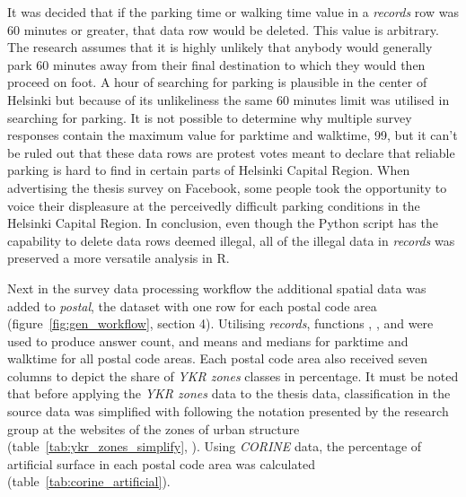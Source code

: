 It was decided that if the parking time or walking time value in a \textit{records} row was 60 minutes or greater, that data row would be deleted. This value is arbitrary. The research assumes that it is highly unlikely that anybody would generally park 60 minutes away from their final destination to which they would then proceed on foot. A hour of searching for parking is plausible in the center of Helsinki but because of its unlikeliness the same 60 minutes limit was utilised in searching for parking. It is not possible to determine why multiple survey responses contain the maximum value for parktime and walktime, 99, but it can't be ruled out that these data rows are protest votes meant to declare that reliable parking is hard to find in certain parts of Helsinki Capital Region. When advertising the thesis survey on Facebook, some people took the opportunity to voice their displeasure at the perceivedly difficult parking conditions in the Helsinki Capital Region. In conclusion, even though the Python script has the capability to delete data rows deemed illegal, all of the illegal data in \textit{records} was preserved a more versatile analysis in R.

Next in the survey data processing workflow the additional spatial data was added to \textit{postal}, the dataset with one row for each postal code area (figure~\ref{fig:gen_workflow}, section 4). Utilising \textit{records}, functions , , and  were used to produce answer count, and means and medians for parktime and walktime for all postal code areas. Each postal code area also received seven columns to depict the share of \textit{YKR zones} classes in percentage. It must be noted that before applying the \textit{YKR zones} data to the thesis data, classification in the source data was simplified with following the notation presented by the research group at the websites of the zones of urban structure (table~\ref{tab:ykr_zones_simplify}, \cite{FinnishEnvironmentInstitute2013}). Using \textit{CORINE} data, the percentage of artificial surface in each postal code area was calculated (table~\ref{tab:corine_artificial}).

